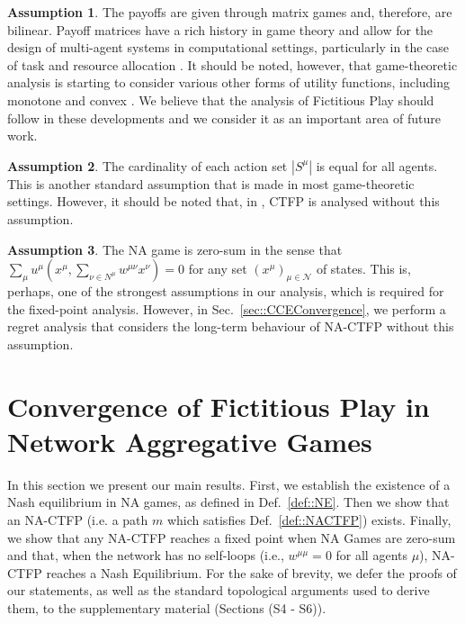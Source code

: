 \documentclass{article}
\theoremstyle{definition}
\newtheorem{assumption}{Assumption}
\newcommand{\agentset}{\mathcal{N}}
\newcommand{\actionset}[1]{S^{#1}}
\newcommand{\wmunu}{w^{\mu \nu}}
\newcommand{\xmu}{x^{\mu}}
\newcommand{\xnu}{x^{\nu}}
\newcommand{\weightedsum}{ \sum_{\nu \in N^\mu} \wmunu \xnu}
\begin{document}
  \begin{assumption}\label{ass::matrixgame}
    The payoffs are given through matrix games and, therefore, are
    bilinear. Payoff matrices have a rich history in game theory and
    allow for the design of multi-agent systems in computational
    settings, particularly in the case of task and resource allocation
    \cite{Nisan2007}. It should be noted, however, that game-theoretic
    analysis is starting to consider various other forms of utility
    functions, including monotone and convex \cite{Parise2020}. We
    believe that the analysis of Fictitious Play should follow in
    these developments and we consider it as an important area of
    future work.
  \end{assumption}

  \begin{assumption}\label{ass::sameactions}
    The cardinality of each action set $|\actionset{\mu}|$ is equal
    for all agents. This is another standard assumption that is made in
    most game-theoretic settings. However, it should be noted that, in \cite{Ewerhart2020},
    CTFP is analysed without this assumption.
  \end{assumption}

  \begin{assumption}\label{ass::zerosum}
    The NA game is zero-sum in the sense that $\sum_{\mu} u^\mu(\xmu,
    \weightedsum) = 0$ for any set $(x^\mu)_{\mu \in \agentset}$ of
    states. This is, perhaps, one of the strongest assumptions in our
    analysis, which is required for the fixed-point analysis. However,
    in Sec.~\ref{sec::CCEConvergence}, we perform a regret analysis
    that considers the long-term behaviour of NA-CTFP without this
    assumption.
  \end{assumption}

\section{Convergence of Fictitious Play in Network Aggregative Games}
\label{sec::CTFPAnalysis}

  
  In this section we present our main results. First, we establish the
  existence of a Nash equilibrium in NA games, as defined in
  Def.~\ref{def::NE}. Then we show that an NA-CTFP (i.e. a path $m$ which satisfies Def.~\ref{def::NACTFP}) exists. Finally, we show that any NA-CTFP reaches a fixed point when
  NA Games are zero-sum and that, when the network has no self-loops
  (i.e., $w^{\mu \mu} = 0$ for all agents $\mu$), NA-CTFP reaches a Nash Equilibrium. For the sake
  of brevity, we defer the proofs of our statements, as well as the
  standard topological arguments used to derive them, to the
  supplementary material (Sections (S4 - S6)).
\end{document}
